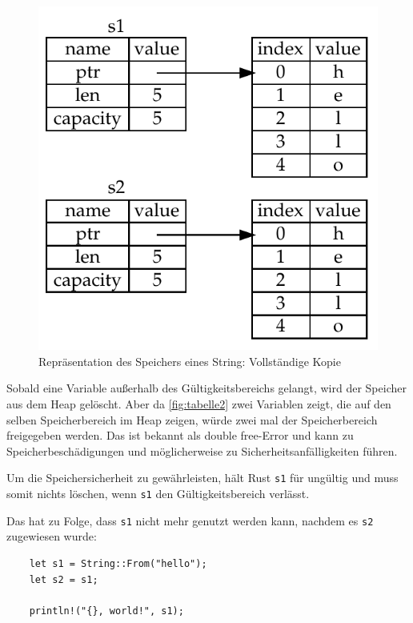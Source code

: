 \begin{figure}[htbp]
    \centering
    \includegraphics[scale=0.9]{Programmierung/Tabelle3.pdf}
    \caption{Repräsentation des Speichers eines String: Vollständige Kopie}
    \label{fig:tabelle3}
\end{figure}

Sobald eine Variable außerhalb des Gültigkeitsbereichs gelangt, wird der Spei\-cher aus dem Heap gelöscht. Aber da \autoref{fig:tabelle2} zwei Variablen zeigt, die auf den selben Speicherbereich im Heap zeigen, würde zwei mal der Speicherbereich freigegeben werden. Das ist bekannt als \glqq double free\grqq{}-Error und kann zu Speicherbeschädigungen und möglicherweise zu Sicherheitsanfälligkeiten führen.

Um die Speichersicherheit zu gewährleisten, hält Rust \verb"s1" für ungültig und muss somit nichts löschen, wenn \verb"s1" den Gültigkeitsbereich verlässt.

Das hat zu Folge, dass \verb"s1" nicht mehr genutzt werden kann, nachdem es \verb"s2" zugewiesen wurde:

\begin{lstlisting}
    let s1 = String::From("hello");
    let s2 = s1;

    println!("{}, world!", s1);
\end{lstlisting}

